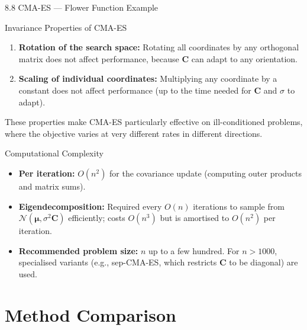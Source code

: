 \documentclass[aspectratio=169,10pt]{beamer}
\begin{document}
\begin{frame}[allowframebreaks]{8.8 CMA-ES --- Flower Function Example}
\begin{block}{Invariance Properties of CMA-ES}
\begin{enumerate}
  \item \textbf{Rotation of the search space:} Rotating all coordinates by any orthogonal matrix does not affect performance, because $\mathbf{C}$ can adapt to any orientation.

  \item \textbf{Scaling of individual coordinates:} Multiplying any coordinate by a constant does not affect performance (up to the time needed for $\mathbf{C}$ and $\sigma$ to adapt).
\end{enumerate}
These properties make CMA-ES particularly effective on ill-conditioned problems, where the objective varies at very different rates in different directions.
\end{block}

\begin{block}{Computational Complexity}
\begin{itemize}
  \item \textbf{Per iteration:} $O(n^2)$ for the covariance update (computing outer products and matrix sums).
  \item \textbf{Eigendecomposition:} Required every $O(n)$ iterations to sample from $\mathcal{N}(\bm{\mu}, \sigma^2\mathbf{C})$ efficiently; costs $O(n^3)$ but is amortised to $O(n^2)$ per iteration.
  \item \textbf{Recommended problem size:} $n$ up to a few hundred. For $n > 1000$, specialised variants (e.g., sep-CMA-ES, which restricts $\mathbf{C}$ to be diagonal) are used.
\end{itemize}
\end{block}

\end{frame}

\section{Method Comparison}
\end{document}
